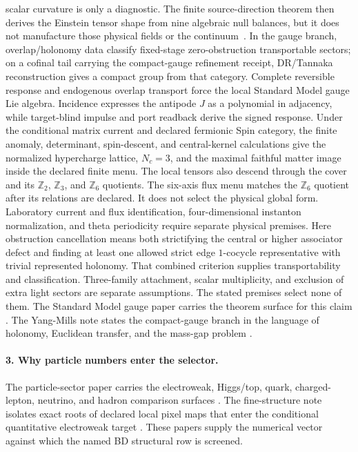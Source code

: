 \documentclass[11pt]{article}
\theoremstyle{remark}
\theoremstyle{plain}
\begin{document}
scalar curvature is only a diagnostic.
The finite source-direction theorem then derives the Einstein tensor shape
from nine algebraic null balances, but it does not manufacture those physical
fields or the continuum~\cite{OPHScreenMicrophysics}. In the gauge branch, overlap/holonomy data classify
fixed-stage zero-obstruction transportable sectors; on a cofinal tail carrying the compact-gauge
refinement receipt, DR/Tannaka reconstruction gives a compact group from that
category. Complete reversible response and endogenous overlap transport
force the local Standard Model gauge Lie algebra. Incidence expresses the antipode \(J\) as
a polynomial in adjacency, while target-blind impulse and port readback
derive the signed response. Under the conditional matrix current and declared
fermionic Spin category, the finite anomaly, determinant, spin-descent, and
central-kernel calculations give the normalized hypercharge lattice, \(N_c=3\), and the maximal
faithful matter image inside the declared finite menu. The local tensors also descend through the cover and its
\(\mathbb Z_2\), \(\mathbb Z_3\), and \(\mathbb Z_6\) quotients. The
six-axis flux menu matches the \(\mathbb Z_6\) quotient after its relations
are declared. It does not select the physical global form. Laboratory
current and flux identification, four-dimensional
instanton normalization, and theta periodicity require separate physical
premises.
Here obstruction cancellation means both strictifying the central or higher associator defect and
finding at least one allowed strict edge \(1\)-cocycle representative with trivial represented
holonomy. That combined
criterion supplies transportability and classification. Three-family attachment, scalar
multiplicity, and exclusion of extra light sectors are separate assumptions.
The stated premises select none of them.
The Standard Model gauge paper carries the theorem surface for this claim \cite{OPHGaugeCore}. The Yang-Mills note
states the compact-gauge branch in the language of holonomy, Euclidean transfer, and the mass-gap
problem \cite{OPHYangMillsGap}.

\paragraph{3. Why particle numbers enter the selector.}
The particle-sector paper carries the electroweak, Higgs/top, quark, charged-lepton, neutrino, and
hadron comparison surfaces \cite{OPHParticleZoo}. The fine-structure note isolates exact roots of
declared local pixel maps that enter the conditional quantitative electroweak target
\cite{OPHFineStructure}. These papers supply
the numerical vector against which the named BD structural row is screened.
\end{document}
